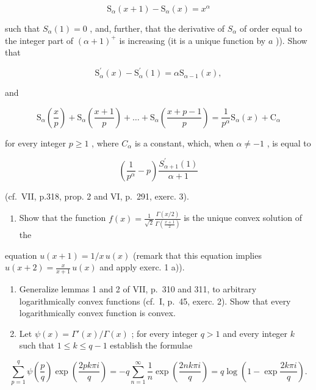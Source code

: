 \[
\mathrm{S} _ {\alpha} (x + 1) - \mathrm{S} _ {\alpha} (x) = x ^ {\alpha}
\]

such that \(S_{\alpha}(1) = 0\) , and, further, that the derivative of \(S_{\alpha}\) of order equal to the integer part of \((\alpha + 1)^{+}\) is increasing (it is a unique function by \(a\) )). Show that

\[
\mathrm{S} _ {\alpha} ^ {\prime} (x) - \mathrm{S} _ {\alpha} ^ {\prime} (1) = \alpha \mathrm{S} _ {\alpha - 1} (x),
\]

and

\[
\mathrm{S} _ {\alpha} \left(\frac {x}{p}\right) + \mathrm{S} _ {\alpha} \left(\frac {x + 1}{p}\right) + \dots + \mathrm{S} _ {\alpha} \left(\frac {x + p - 1}{p}\right) = \frac {1}{p ^ {\alpha}} \mathrm{S} _ {\alpha} (x) + \mathrm{C} _ {\alpha}
\]

for every integer \(p \geqslant 1\) , where \(C_{\alpha}\) is a constant, which, when \(\alpha \neq -1\) , is equal to

\[
\left(\frac {1}{p ^ {\alpha}} - p\right) \frac {S _ {\alpha + 1} ^ {\prime} (1)}{\alpha + 1}
\]

(cf.~VII, p.318, prop. 2 and VI, p.~291, exerc. 3).

\begin{enumerate}
\def\labelenumi{\arabic{enumi})}
\setcounter{enumi}{3}
\tightlist
\item
  Show that the function \(f(x) = \frac{1}{\sqrt{2}}\frac{\Gamma(x / 2)}{\Gamma\left(\frac{x + 1}{2}\right)}\) is the unique convex solution of the
\end{enumerate}

equation \(u(x + 1) = 1 / x \, u(x)\) (remark that this equation implies \(u(x + 2) = \frac{x}{x + 1} \, u(x)\) and apply exerc. 1 a)).

\begin{enumerate}
\def\labelenumi{\arabic{enumi})}
\setcounter{enumi}{4}
\item
  Generalize lemmas 1 and 2 of VII, p.~310 and 311, to arbitrary logarithmically convex functions (cf.~I, p.~45, exerc. 2). Show that every logarithmically convex function is convex.
\item
  Let \(\psi(x) = \Gamma'(x)/\Gamma(x)\) ; for every integer \(q > 1\) and every integer \(k\) such that \(1 \leqslant k \leqslant q - 1\) establish the formulae
\end{enumerate}

\[
\sum_ {p = 1} ^ {q} \psi \left(\frac {p}{q}\right) \exp \left(\frac {2 p k \pi i}{q}\right) = - q \sum_ {n = 1} ^ {\infty} \frac {1}{n} \exp \left(\frac {2 n k \pi i}{q}\right) = q \log \left(1 - \exp \frac {2 k \pi i}{q}\right).
\]

